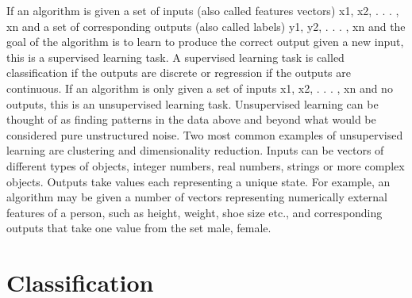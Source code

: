 \documentclass[a4paper,12pt,times,numbered,print,index]{Classes/PhDThesisPSnPDF}
\begin{document}
If an algorithm is given a set of inputs (also called features vectors) {x1, x2, . . . , xn} and a set
of corresponding outputs (also called labels) {y1, y2, . . . , xn} and the goal of the algorithm is
to learn to produce the correct output given a new input, this is a supervised learning task.
A supervised learning task is called classification if the outputs are discrete or regression if
the outputs are continuous.
If an algorithm is only given a set of inputs {x1, x2, . . . , xn} and no outputs, this is an
unsupervised learning task. Unsupervised learning can be thought of as finding patterns in
the data above and beyond what would be considered pure unstructured noise. Two most
common examples of unsupervised learning are clustering and dimensionality reduction.
Inputs can be vectors of different types of objects, integer numbers, real numbers, strings
or more complex objects. Outputs take values each representing a unique state. For example,
an algorithm may be given a number of vectors representing numerically external features
of a person, such as height, weight, shoe size etc., and corresponding outputs that take one
value from the set {male, female}.

\section{Classification}
\end{document}
